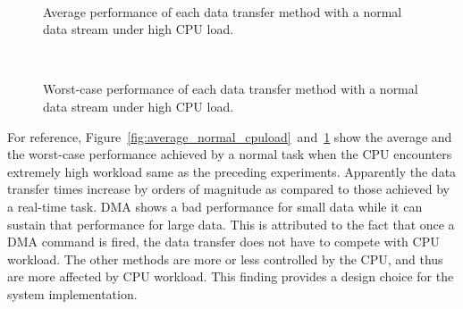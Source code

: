 \begin{figure}[!t]
 \begin{center}
  \\
  \caption{Average performance of each data transfer method with a
  normal data stream under high CPU load.}
  \label{fig:average_normal_cpuload}
 \end{center}
 \vspace{0.5em}
 \begin{center}
  \\
  \caption{Worst-case performance of each data transfer method with a
  normal data stream under high CPU load.}
  \label{fig:worst_normal_cpuload}
 \end{center}
\end{figure}

For reference,
Figure~\ref{fig:average_normal_cpuload}~and~\ref{fig:worst_normal_cpuload}
show the average and the worst-case performance achieved by a normal
task when the CPU encounters extremely high workload same as the
preceding experiments.
Apparently the data transfer times increase by orders of magnitude as
compared to those achieved by a real-time task.
\textsf{DMA} shows a bad performance for small data while it can sustain
that performance for large data.
This is attributed to the fact that once a DMA command is fired, the
data transfer does not have to compete with CPU workload.
The other methods are more or less controlled by the CPU, and thus are
more affected by CPU workload.
This finding provides a design choice for the system implementation.

